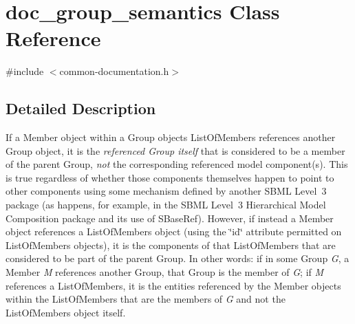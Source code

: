 \hypertarget{classdoc__group__semantics}{}\section{doc\+\_\+group\+\_\+semantics Class Reference}
\label{classdoc__group__semantics}


{\ttfamily \#include $<$common-\/documentation.\+h$>$}



\subsection{Detailed Description}
\begin{DoxyParagraph}{}
If a Member object within a Group object\textquotesingle{}s List\+Of\+Members references another Group object, it is the {\itshape referenced Group itself} that is considered to be a member of the parent Group, {\itshape not} the corresponding referenced model component(s). This is true regardless of whether those components themselves happen to point to other components using some mechanism defined by another S\+B\+ML Level~3 package (as happens, for example, in the S\+B\+ML Level~3 Hierarchical Model Composition package and its use of S\+Base\+Ref). However, if instead a Member object references a List\+Of\+Members object (using the \char`\"{}id\char`\"{} attribute permitted on List\+Of\+Members objects), it is the components of that List\+Of\+Members that are considered to be part of the parent Group. In other words\+: if in some Group {\itshape G}, a Member {\itshape M} references another Group, that Group is the member of {\itshape G}; if {\itshape M} references a List\+Of\+Members, it is the entities referenced by the Member objects within the List\+Of\+Members that are the members of {\itshape G} and not the List\+Of\+Members object itself.
\end{DoxyParagraph}
